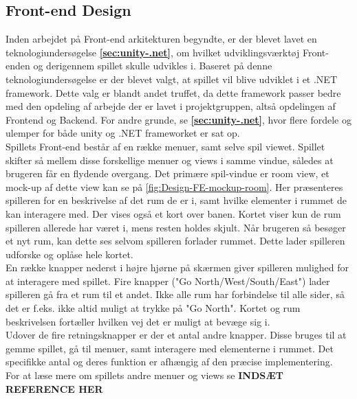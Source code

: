 \subsection{Front-end Design}
\label{ssec:FE Design}

Inden arbejdet på Front-end arkitekturen begyndte, er der blevet lavet en teknologiundersøgelse \textbf{\autoref{sec:unity-.net}}, om hvilket udviklingsværktøj Front-enden og derigennem spillet skulle udvikles i. Baseret på denne teknologiundersøgelse er der blevet valgt, at spillet vil blive udviklet i et .NET framework. Dette valg er blandt andet truffet, da dette framework passer bedre med den opdeling af arbejde der er lavet i projektgruppen, altså opdelingen af Frontend og Backend. For andre grunde, se \textbf{\autoref{sec:unity-.net}}, hvor flere fordele og ulemper for både unity og .NET frameworket er sat op.\\

\noindent Spillets Front-end består af en række menuer, samt selve spil viewet. Spillet skifter så mellem disse forskellige menuer og views i samme vindue, således at brugeren får en flydende overgang.
Det primære spil-vindue er room view, et mock-up af dette view kan se på \autoref{fig:Design-FE-mockup-room}. Her præsenteres spilleren for en beskrivelse af det rum de er i, samt hvilke elementer i rummet de kan interagere med. Der vises også et kort over banen. Kortet viser kun de rum spilleren allerede har været i, mens resten holdes skjult. Når brugeren så besøger et nyt rum, kan dette ses selvom spilleren forlader rummet. Dette lader spilleren udforske og oplåse hele kortet.\\
En række knapper nederst i højre hjørne på skærmen giver spilleren mulighed for at interagere med spillet. Fire knapper ("Go {North/West/South/East}") lader spilleren gå fra et rum til et andet. Ikke alle rum har forbindelse til alle sider, så det er f.eks. ikke altid muligt at trykke på "Go North". Kortet og rum beskrivelsen fortæller hvilken vej det er muligt at bevæge sig i.\\
Udover de fire retningsknapper er der et antal andre knapper. Disse bruges til at gemme spillet, gå til menuer, samt interagere med elementerne i rummet. Det specifikke antal og deres funktion er afhængig af den præcise implementering.\\

\noindent For at læse mere om spillets andre menuer og views se \textbf{INDSÆT REFERENCE HER}

